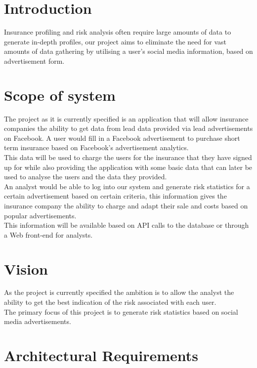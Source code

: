 \documentclass{article}
\begin{document}

\section{Introduction}
 Insurance profiling and risk analysis often require large amounts of data to generate in-depth profiles, our project aims to eliminate the need for vast amounts of data gathering by utilising a user's social media information, based on advertisement form.

\section{Scope of system} 
The project as it is currently specified is an application that will allow insurance companies the ability to get data from lead data provided via lead advertisements on Facebook.
A user would fill in a Facebook advertisement to purchase short term insurance based on Facebook's advertisement analytics. \\
This data will be used to charge the users for the insurance that they have signed up for while also providing the application with some basic data that can later be used to analyse the users and the data they provided. \\
An analyst would be able to log into our system and generate risk statistics for a certain advertisement based on certain criteria, this information gives the insurance company the ability to charge and adapt their sale and costs based on popular advertisements.\\
This information will be available based on API calls to the database or through a Web front-end for analysts.

\section{Vision}
As the project is currently specified the ambition is to allow the analyst the ability to get the best indication of the risk associated with each user.\\
The primary focus of this project is to generate risk statistics based on social media advertisements.


\section{Architectural Requirements}
\end{document}
